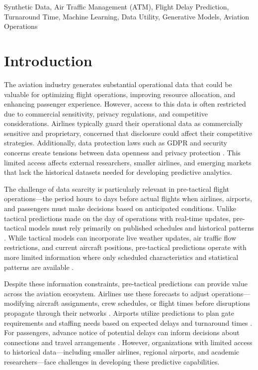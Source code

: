 \documentclass[conference]{IEEEtran}
\begin{document}
\begin{IEEEkeywords}
Synthetic Data, Air Traffic Management (ATM), Flight Delay Prediction, Turnaround Time, Machine Learning, Data Utility, Generative Models, Aviation Operations
\end{IEEEkeywords}

\section{Introduction}


The aviation industry generates substantial operational data that could be valuable for optimizing flight operations, improving resource allocation, and enhancing passenger experience. However, access to this data is often restricted due to commercial sensitivity, privacy regulations, and competitive considerations. Airlines typically guard their operational data as commercially sensitive and proprietary, concerned that disclosure could affect their competitive strategies.%
Additionally, data protection laws such as GDPR and security concerns create tensions between data openness and privacy protection \cite{lei2025fedmeta}. This limited access affects external researchers, smaller airlines, and emerging markets that lack the historical datasets needed for developing predictive analytics.


The challenge of data scarcity is particularly relevant in pre-tactical flight operations—the period hours to days before actual flights when airlines, airports, and passengers must make decisions based on anticipated conditions. Unlike tactical predictions made on the day of operations with real-time updates, pre-tactical models must rely primarily on published schedules and historical patterns \cite{dalmau2024probabilistic}. While tactical models can incorporate live weather updates, air traffic flow restrictions, and current aircraft positions, pre-tactical predictions operate with more limited information where only scheduled characteristics and statistical patterns are available \cite{mas2022pre}.

Despite these information constraints, pre-tactical predictions can provide value across the aviation ecosystem. Airlines use these forecasts to adjust operations—modifying aircraft assignments, crew schedules, or flight times before disruptions propagate through their networks \cite{mas2022pre}. Airports utilize predictions to plan gate requirements and staffing needs based on expected delays and turnaround times \cite{de2023probabilistic}. For passengers, advance notice of potential delays can inform decisions about connections and travel arrangements \cite{carvalho2021relevance}. However, organizations with limited access to historical data—including smaller airlines, regional airports, and academic researchers—face challenges in developing these predictive capabilities.
\end{document}

